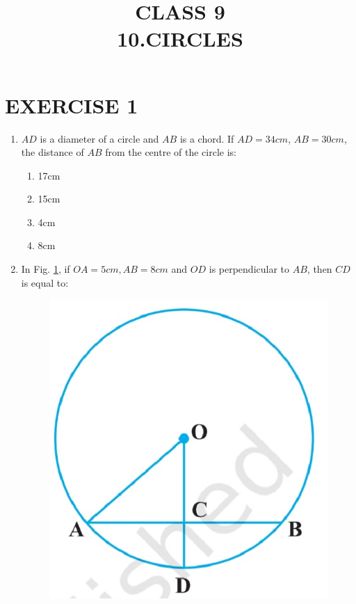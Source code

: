 \documentclass{article}
\begin{document}
 
\title{CLASS 9\\10.CIRCLES}
\date{}
\maketitle
\section{EXERCISE 1}
\begin{enumerate}
\item $AD$ is a diameter of a circle and $AB$ is a chord. If $AD = 34 cm$, $AB = 30 cm$, the distance of $AB$ from the centre of the circle is:
\begin{enumerate}
\item 17cm
\item 15cm
\item 4cm
\item 8cm
\end{enumerate}
\item In Fig. \ref{fig:10.3}, if $OA = 5cm, AB = 8cm$ and $OD$ is perpendicular to $AB$, then $CD$ is equal to:
\begin{figure}[H]
\centering
\includegraphics[width=\columnwidth]{figs/10.3.jpg}
\caption{}
\label{fig:10.3}
\end{figure}

\end{enumerate}
\end{document}
